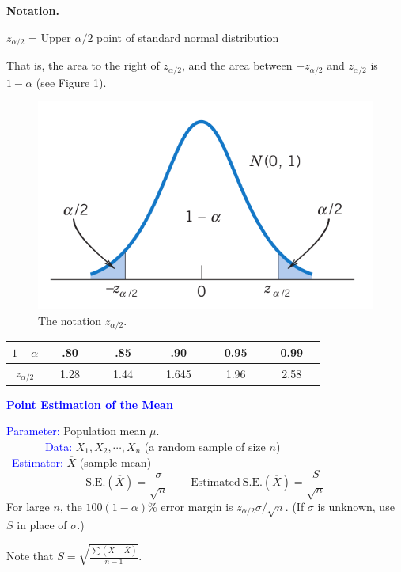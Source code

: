 \documentclass[12pt,a4paper]{article}
\newcommand{\dispsty}{\displaystyle}
\newcommand{\SE}{\text{S.E.}}
\begin{document}
\begin{tcolorbox}[colback=white]
	\textbf{Notation.}\begin{center}
	$z_{\alpha/2}$ = Upper $\alpha/2$ point of standard normal distribution
\end{center} That is, the area to the right of $z_{\alpha/2}$, and the area between $-z_{\alpha/2}$ and $z_{\alpha/2}$ is $1-\alpha$ (see Figure 1).
\end{tcolorbox}
\begin{figure}[h!]
	\centering
	\includegraphics[scale=0.3]{8-2.png}
	\caption{The notation $z_{\alpha/2}$.}
\end{figure}
\begin{center}\begin{tabular}{c||ccc|ccc|ccc|ccc|ccc}
		\toprule[1.5pt]
		$1-\alpha$ && .80 &&& .85 &&& .90 &&& 0.95 &&& 0.99 &\\
		\hline
		$z_{\alpha/2}$ && 1.28 &&& 1.44 &&& 1.645 &&& 1.96 &&& 2.58 &\\
		\bottomrule[1.5pt]
	\end{tabular}
\end{center}

\begin{tcolorbox}[colback=white]\begin{center}
		\textcolor{blue}{\bf Point Estimation of the Mean}
	\end{center}
	\textcolor{blue}{Parameter:} Population mean $\mu$. \\
	\textcolor{blue}{\ \ \ \ \ \  \ Data:} $X_1,X_2,\cdots,X_n$ (a random sample of size $n$)\\
	\textcolor{blue}{\ Estimator:} $\overline{X}$ (sample mean) \\
	\[
	\SE(\overline{X})=\frac{\sigma}{\sqrt{n}}\qquad\text{Estimated}\ \SE(\overline{X}) = \frac{S}{\sqrt{n}}
	\] For large $n$, the $100(1-\alpha)\%$ error margin is $z_{\alpha/2}\sigma/\sqrt{n}$. (If $\sigma$ is unknown, use $S$ in place of $\sigma$.)
\end{tcolorbox} Note that $\dispsty S=\sqrt{\frac{\sum(X-\overline{X})}{n-1}}$.
\end{document}
